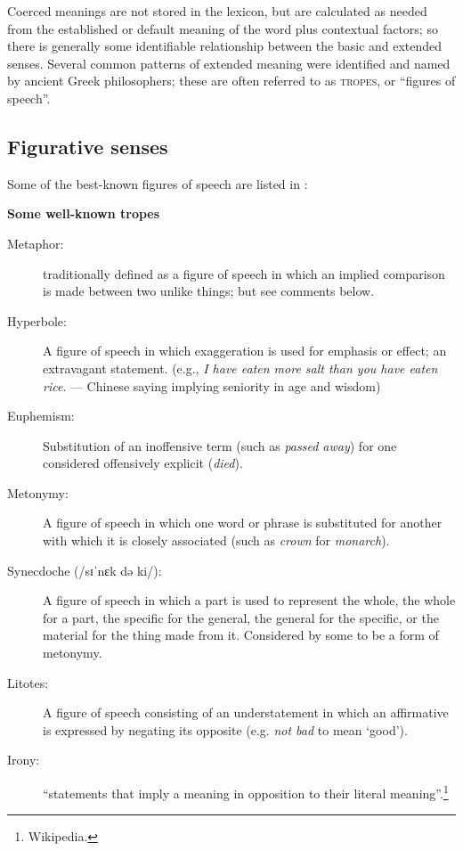 Coerced meanings are not stored in the lexicon, but are calculated as needed from the established or default meaning of the word plus contextual factors; so there is generally some identifiable relationship between the basic and extended senses. Several common patterns of extended meaning were identified and named by ancient Greek philosophers; these are often referred to as \textsc{tropes}, or “figures of speech”.


\subsection{Figurative senses}\label{sec:5.4.1}

Some of the best-known figures of speech are listed in :

\ea \label{ex:5.18}
\textbf{Some well-known tropes}\\
\begin{description}
\item[Metaphor:] traditionally defined as a figure of speech in which an implied comparison is made between two unlike things; but see comments below.
\item[Hyperbole:] A figure of speech in which exaggeration is used for emphasis or effect; an extravagant statement. (e.g., \textit{I have eaten more salt than you have eaten rice}. — Chinese saying implying seniority in age and wisdom)
\item[Euphemism:] Substitution of an inoffensive term (such as \textit{passed away}) for one considered offensively explicit (\textit{died}).
\item[Metonymy:] A figure of speech in which one word or phrase is substituted for another with which it is closely associated (such as \textit{crown} for \textit{monarch}).
\item[Synecdoche (/sɪˈnɛk də ki/):] A figure of speech in which a part is used to represent the whole, the whole for a part, the specific for the general, the general for the specific, or the material for the thing made from it. Considered by some to be a form of metonymy.
\item[Litotes:] A figure of speech consisting of an understatement in which an affirmative is expressed by negating its opposite (e.g. \textit{not bad} to mean ‘good’).
\item[Irony:] “statements that imply a meaning in opposition to their literal meaning”.\footnote{Wikipedia.}
\end{description}
\z


